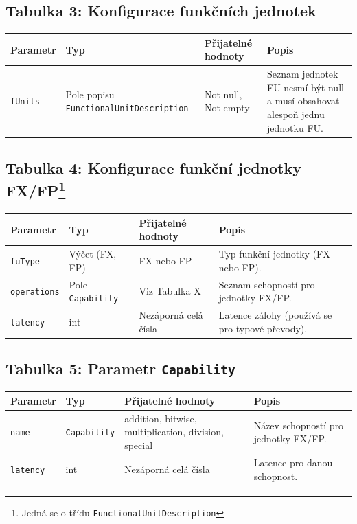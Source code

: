 \subsection*{Tabulka 3: Konfigurace funkčních jednotek}

\begin{tabular}{|l|p{4.1cm}|p{3.5cm}|p{4cm}|}
\hline
Parametr & Typ & Přijatelné hodnoty & Popis \\
\hline
\texttt{fUnits} & Pole popisu \texttt{Functional\-Unit\-Description} & Not null, Not empty & Seznam jednotek FU nesmí být null a musí obsahovat alespoň jednu jednotku FU. \\
\hline
\end{tabular}

\subsection*{Tabulka 4: Konfigurace funkční jednotky FX/FP\footnote{Jedná se o třídu \texttt{Functional\-Unit\-Description}}}

\begin{tabular}{|l|l|l|p{4.95cm}|}
\hline
Parametr & Typ & Přijatelné hodnoty & Popis \\
\hline
\texttt{fuType} & Výčet (FX, FP) & FX nebo FP & Typ funkční jednotky (FX nebo FP). \\
\texttt{operations} & Pole \texttt{Capability} & Viz Tabulka X & Seznam schopností pro jednotky FX/FP. \\
\texttt{latency} & int & Nezáporná celá čísla & Latence zálohy (používá se pro typové převody). \\
\hline
\end{tabular}

\subsection*{Tabulka 5: Parametr \texttt{Capability}}

\begin{tabular}{|l|l|p{4.9cm}|p{4.8cm}|}
\hline
Parametr & Typ & Přijatelné hodnoty & Popis \\
\hline
\texttt{name} & \texttt{Capability} & addition, bitwise, multiplication, division, special & Název schopností pro jednotky FX/FP. \\
\texttt{latency} & int & Nezáporná celá čísla & Latence pro danou schopnost. \\
\hline
\end{tabular}

